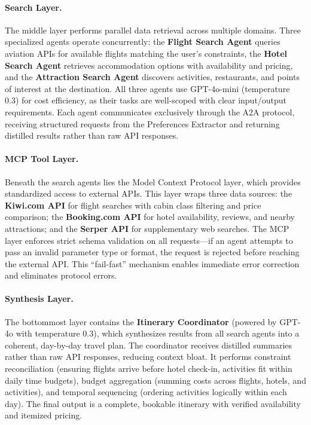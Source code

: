 \documentclass[preprint,review,12pt]{elsarticle}
\begin{document}
\paragraph{Search Layer.} The middle layer performs parallel data retrieval across multiple domains. Three specialized agents operate concurrently: the \textbf{Flight Search Agent} queries aviation APIs for available flights matching the user's constraints, the \textbf{Hotel Search Agent} retrieves accommodation options with availability and pricing, and the \textbf{Attraction Search Agent} discovers activities, restaurants, and points of interest at the destination. All three agents use GPT-4o-mini (temperature 0.3) for cost efficiency, as their tasks are well-scoped with clear input/output requirements. Each agent communicates exclusively through the A2A protocol, receiving structured requests from the Preferences Extractor and returning distilled results rather than raw API responses.

\paragraph{MCP Tool Layer.} Beneath the search agents lies the Model Context Protocol layer, which provides standardized access to external APIs. This layer wraps three data sources: the \textbf{Kiwi.com API} for flight searches with cabin class filtering and price comparison; the \textbf{Booking.com API} for hotel availability, reviews, and nearby attractions; and the \textbf{Serper API} for supplementary web searches. The MCP layer enforces strict schema validation on all requests---if an agent attempts to pass an invalid parameter type or format, the request is rejected before reaching the external API. This ``fail-fast'' mechanism enables immediate error correction and eliminates protocol errors.

\paragraph{Synthesis Layer.} The bottommost layer contains the \textbf{Itinerary Coordinator} (powered by GPT-4o with temperature 0.3), which synthesizes results from all search agents into a coherent, day-by-day travel plan. The coordinator receives distilled summaries rather than raw API responses, reducing context bloat. It performs constraint reconciliation (ensuring flights arrive before hotel check-in, activities fit within daily time budgets), budget aggregation (summing costs across flights, hotels, and activities), and temporal sequencing (ordering activities logically within each day). The final output is a complete, bookable itinerary with verified availability and itemized pricing.
\end{document}
